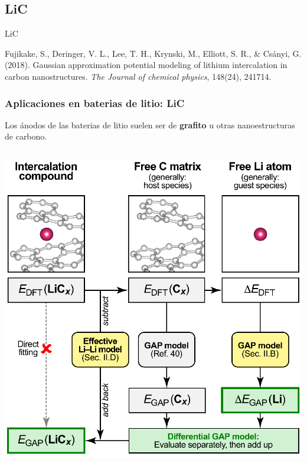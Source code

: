 \documentclass[aspectratio=169]{beamer}
\let\oldtextbf\textbf
\renewcommand{\textbf}[1]{\textcolor{nordblue}{\oldtextbf{#1}}}
\begin{document}
    \subsection{LiC}
    \begin{frame}
        \begin{center}
            {\huge LiC}
        \end{center}
        \tiny{
            Fujikake, S., Deringer, V. L., Lee, T. H., Krynski, M., 
            Elliott, S. R., \& Csányi, G. (2018). Gaussian approximation 
            potential modeling of lithium intercalation in carbon 
            nanostructures. \textit{The Journal of chemical physics}, 148(24), 241714.
        }
    \end{frame}
    
    \begin{frame}
        \frametitle{Aplicaciones en baterias de litio: LiC}
            
        Los ánodos de las baterias de litio suelen ser de \textbf{grafito} u otras
        nanoestructuras de carbono.
        
        \begin{columns}
            \begin{center}
                \includegraphics[width=\columnwidth]{LiC-metodo.png}
            \end{center}


\end{columns}
\end{frame}
\end{document}

